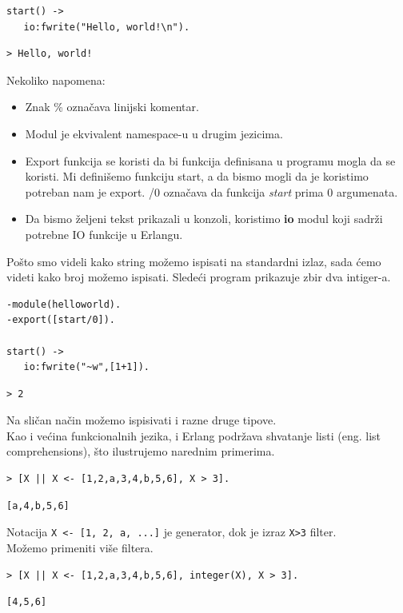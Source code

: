 \documentclass[a4paper]{article}
\begin{document}
{\begin{verbatim}
start() -> 
   io:fwrite("Hello, world!\n").
\end{verbatim}
\begin{verbatim}
> Hello, world!
\end{verbatim}

Nekoliko napomena:
\begin{itemize}
  \item Znak \% označava linijski komentar.
  \item Modul je ekvivalent namespace-u u drugim jezicima.
  \item Export funkcija se koristi da bi funkcija definisana u programu mogla da se koristi. Mi definišemo funkciju start, a da bismo mogli da je koristimo potreban nam je export. /0 označava da funkcija \textit{start} prima 0 argumenata.
  \item Da bismo željeni tekst prikazali u konzoli, koristimo \textbf{io} modul koji sadrži potrebne IO funkcije u Erlangu.
\end{itemize}

Pošto smo videli kako string možemo ispisati na standardni izlaz, sada ćemo videti kako broj možemo ispisati. Sledeći program prikazuje zbir dva intiger-a.

\begin{verbatim}
-module(helloworld).
-export([start/0]).

start() ->
   io:fwrite("~w",[1+1]).
\end{verbatim}
\begin{verbatim}
> 2
\end{verbatim}

Na sličan način možemo ispisivati i razne druge tipove.\\

Kao i većina funkcionalnih jezika, i Erlang podržava shvatanje listi (eng. list comprehensions), što ilustrujemo narednim primerima.
\begin{verbatim}
> [X || X <- [1,2,a,3,4,b,5,6], X > 3].
\end{verbatim}
\begin{verbatim}
[a,4,b,5,6]
\end{verbatim}
Notacija {\texttt{X <- [1, 2, a, ...]}} je generator, dok je izraz {\texttt{X>3}} filter.\\

Možemo primeniti više filtera.
\begin{verbatim}
> [X || X <- [1,2,a,3,4,b,5,6], integer(X), X > 3].
\end{verbatim}
\begin{verbatim}
[4,5,6]
\end{verbatim}

}
\end{document}
